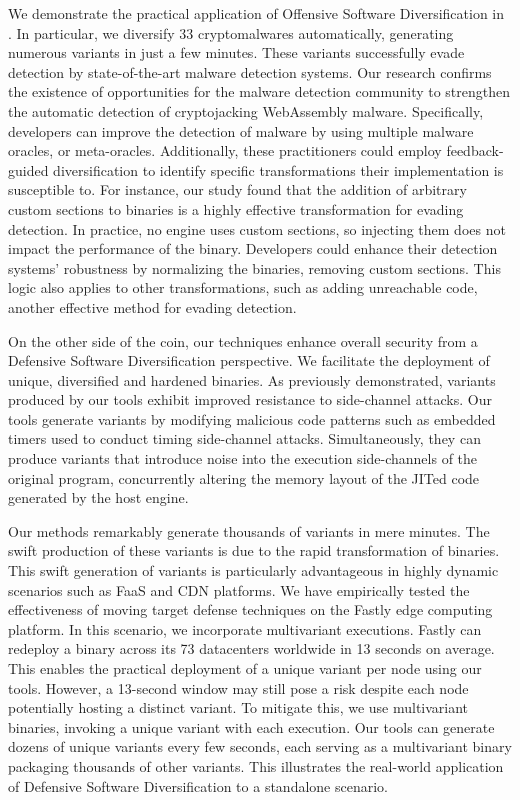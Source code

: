 We demonstrate the practical application of Offensive Software Diversification in \Wasm.
In particular, we diversify 33 \Wasm cryptomalwares automatically, generating numerous variants in just a few minutes.
These variants successfully evade detection by state-of-the-art malware detection systems.
Our research confirms the existence of opportunities for the malware detection community to strengthen the automatic detection of cryptojacking WebAssembly malware.
Specifically, developers can improve the detection of \Wasm malware by using multiple malware oracles, or meta-oracles.
Additionally, these practitioners could employ feedback-guided diversification to identify specific transformations their implementation is susceptible to.
For instance, our study found that the addition of arbitrary custom sections to \Wasm binaries is a highly effective transformation for evading detection.
In practice, no \Wasm engine uses custom sections, so injecting them does not impact the performance of the \Wasm binary.
Developers could enhance their detection systems' robustness by normalizing the \Wasm binaries, removing custom sections.
This logic also applies to other transformations, such as adding unreachable code, another effective method for evading detection.


On the other side of the coin, our techniques enhance overall security from a Defensive Software Diversification perspective.
We facilitate the deployment of unique, diversified and hardened \Wasm binaries.
As previously demonstrated, \Wasm variants produced by our tools exhibit improved resistance to side-channel attacks.
Our tools generate variants by modifying malicious code patterns such as embedded timers used to conduct timing side-channel attacks.
Simultaneously, they can produce variants that introduce noise into the execution side-channels of the original program, concurrently altering the memory layout of the JITed code generated by the host engine.


Our methods remarkably generate thousands of variants in mere minutes. 
The swift production of these variants is due to the rapid transformation of \Wasm binaries. 
This swift generation of variants is particularly advantageous in highly dynamic scenarios such as FaaS and CDN platforms. 
We have empirically tested the effectiveness of moving target defense techniques\cite{jackson2011compiler} on the Fastly edge computing platform. 
In this scenario, we incorporate multivariant executions\cite{MEWE}. 
Fastly can redeploy a \Wasm binary across its 73 datacenters worldwide in 13 seconds on average. 
This enables the practical deployment of a unique variant per node using our tools. 
However, a 13-second window may still pose a risk despite each node potentially hosting a distinct \Wasm variant. 
To mitigate this, we use multivariant binaries, invoking a unique variant with each execution. 
Our tools can generate dozens of unique variants every few seconds, each serving as a multivariant binary packaging thousands of other variants. 
This illustrates the real-world application of Defensive Software Diversification to a \Wasm standalone scenario.







